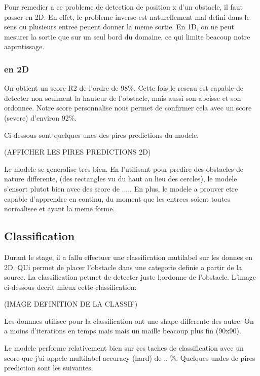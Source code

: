     Pour remedier a ce probleme de detection de position x d'un obstacle, il faut passer en 2D.  En effet, le probleme inverse est naturellement mal defini dans le sens ou plusieurs entree peuent donner la meme sortie. En 1D, on ne peut mesurer la sortie que sur un seul bord du domaine, ce qui limite beacoup notre aaprntissage.
    
    \subsubsection{en 2D}
    On obtient un score R2 de l'ordre de 98\%. Cette fois le reseau est capable de detecter non seulment la hauteur de l'obstacle, mais aussi son abcisse et son ordonnee. Notre score personnalise nous permet de confirmer cela avec un score (severe) d'environ 92\%.
    
    Ci-dessous sont quelques unes des pires predictions du modele.
    
    (AFFICHER LES PIRES PREDICTIONS 2D)
    
    Le modele se generalise tres bien. En l'utilisant pour predire des obstacles de nature differente, (des rectangles vu du haut au lieu des cercles), le modele s'ensort plutot bien avec des score de .....
    En plus, le modele a prouver etre capable d'apprendre en continu, du moment que les entrees soient toutes normalisee et ayant la meme forme.

\subsection{Classification}
Durant le stage, il a fallu effectuer une classification mutilabel sur les donnes en 2D. QUi permet de placer l'obstacle dans une categorie definie a partir de la source. La classification petmet de detecter juste l;ordonne de l'obstacle. L'image ci-dessous decrit mieux cette classification:

(IMAGE DEFINITION DE LA CLASSIF)

Les donnnes utilisee pour la classification ont une shape differente des autre. On a moins d'iterations en temps mais mais un maille beacoup plus fin (90x90).

Le modele performe relativement bien sur ces taches de classification avec un score que j'ai appele multilabel accuracy (hard) de .. \%. 
Quelques undes de pires prediction sont les suivantes.

